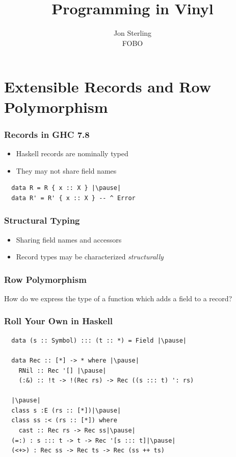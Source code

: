 \documentclass[tikz, 12pt]{beamer}
\title{Programming in Vinyl}
\author{Jon Sterling\\
    FOBO
}
\begin{document}
\begin{frame}
\titlepage
\end{frame}

\section{Extensible Records and Row Polymorphism}

\begin{frame}[fragile]
  \frametitle{Records in GHC 7.8}\pause
  \begin{itemize}
    \item Haskell records are nominally typed\pause
    \item They may not share field names
  \end{itemize}
  \pause
  \begin{lstlisting}
  data R = R { x :: X } |\pause|
  data R' = R' { x :: X } -- ^ Error
  \end{lstlisting}
\end{frame}

\begin{frame}
  \frametitle{Structural Typing}\pause
  \begin{itemize}
    \item Sharing field names and accessors\pause
    \item Record types may be characterized \emph{structurally}
  \end{itemize}
\end{frame}

\begin{frame}
  \frametitle{Row Polymorphism}\pause
  How do we express the type of a function which adds a field to a record?\pause
\end{frame}

\begin{frame}[fragile]
  \frametitle{Roll Your Own in Haskell}\pause
  \begin{lstlisting}
  data (s :: Symbol) ::: (t :: *) = Field |\pause|

  data Rec :: [*] -> * where |\pause|
    RNil :: Rec '[] |\pause|
    (:&) :: !t -> !(Rec rs) -> Rec ((s ::: t) ': rs)

  |\pause|
  class s :E (rs :: [*])|\pause|
  class ss :< (rs :: [*]) where
    cast :: Rec rs -> Rec ss|\pause|
  (=:) : s ::: t -> t -> Rec '[s ::: t]|\pause|
  (<+>) : Rec ss -> Rec ts -> Rec (ss ++ ts)
  \end{lstlisting}
\end{frame}
\end{document}
